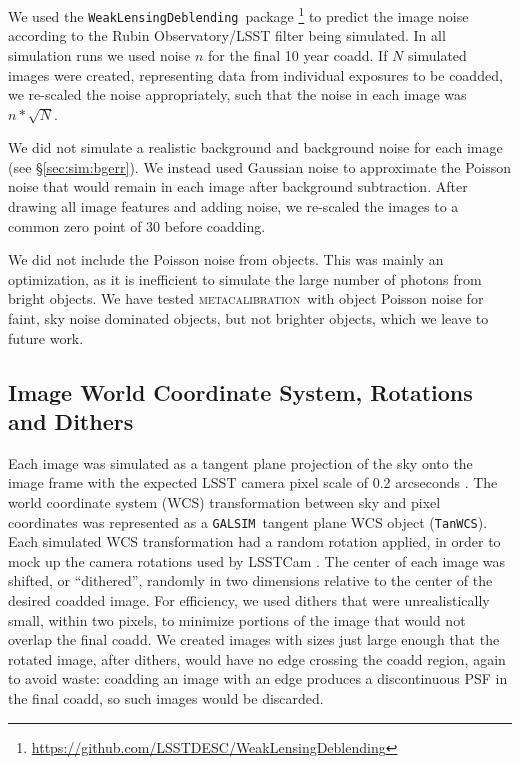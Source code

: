 \documentclass[twocolumn,twocolappendix,astrosym]{openjournal}
\newcommand{\descwl}{\texttt{WeakLensingDeblending}}
\newcommand{\galsim}{\texttt{GALSIM}}
\newcommand{\mcal}{\textsc{metacalibration}}
\begin{document}
We used the \descwl\ package
\citep{DESCWLSanchez2021}\footnote{\url{https://github.com/LSSTDESC/WeakLensingDeblending}}
to predict the image noise according to the Rubin Observatory/LSST filter being
simulated.  In all simulation runs we used noise $n$ for the final 10 year
coadd.  If $N$ simulated images were created, representing data from individual
exposures to be coadded, we re-scaled the noise appropriately, such that the
noise in each image was $n * \sqrt{N}$.

We did not simulate a realistic background and background noise for each image
(see \S \ref{sec:sim:bgerr}).  We instead used Gaussian noise to approximate
the Poisson noise that would remain in each image after background subtraction.
After drawing all image features and adding noise, we re-scaled the images to a
common zero point of 30 before coadding.

We did not include the Poisson noise from objects.  This was mainly an
optimization, as it is inefficient to simulate the large number of photons from
bright objects.   We have tested \mcal\ with object Poisson noise for faint,
sky noise dominated objects, but not brighter objects, which we leave to future
work.

\subsection{Image World Coordinate System, Rotations and Dithers} \label{sec:sim:rotdith}

Each image was simulated as a tangent plane projection of the sky onto the
image frame with the expected LSST camera pixel scale of 0.2 arcseconds
\citep{IvezicLSST2008}.  The world coordinate system (WCS) transformation between
sky and pixel coordinates was represented as a \galsim\ tangent plane
WCS object (\texttt{TanWCS}).
Each simulated WCS transformation had a random rotation applied, in order to
mock up the camera rotations used by LSSTCam \citep{IvezicLSST2008}.  The
center of each image was shifted, or ``dithered'', randomly in two dimensions
relative to the center of the desired coadded image.  For efficiency, we used
dithers that were unrealistically small, within two pixels, to minimize portions of the
image that would not overlap the final coadd.  We created images with sizes just
large enough that the rotated image, after dithers, would have no edge
crossing the coadd region, again to avoid waste:  coadding an image with an
edge produces a discontinuous PSF in the final coadd, so such images would be
discarded.
\end{document}
